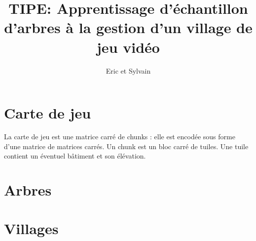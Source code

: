 \documentclass{article}
\title{TIPE: Apprentissage d'échantillon d'arbres à la gestion d'un village de jeu vidéo}
\author{Eric et Sylvain}
\date{}
\begin{document}
\maketitle
\tableofcontents
\newpage

\section{Carte de jeu}

La carte de jeu est une matrice carré de chunks : elle est encodée sous forme d'une matrice de matrices carrés. Un chunk est un bloc carré de tuiles. Une tuile contient un éventuel bâtiment et son élévation.

\section{Arbres}

\section{Villages}
\end{document}
